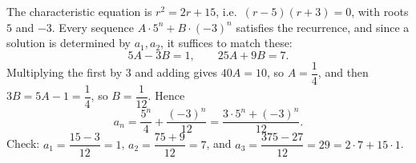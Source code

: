 The characteristic equation is $r^2=2r+15$, i.e.\ $(r-5)(r+3)=0$, with roots $5$ and $-3$. Every sequence $A\cdot5^n+B\cdot(-3)^n$ satisfies the recurrence, and since a solution is determined by $a_1,a_2$, it suffices to match these:
\[
5A-3B=1,\qquad 25A+9B=7 .
\]
Multiplying the first by $3$ and adding gives $40A=10$, so $A=\dfrac{1}{4}$, and then $3B=5A-1=\dfrac{1}{4}$, so $B=\dfrac{1}{12}$. Hence
\[
\boxed{a_n=\dfrac{5^n}{4}+\dfrac{(-3)^n}{12}=\dfrac{3\cdot5^n+(-3)^n}{12}}.
\]
Check: $a_1=\dfrac{15-3}{12}=1$, $a_2=\dfrac{75+9}{12}=7$, and $a_3=\dfrac{375-27}{12}=29=2\cdot7+15\cdot1$.
